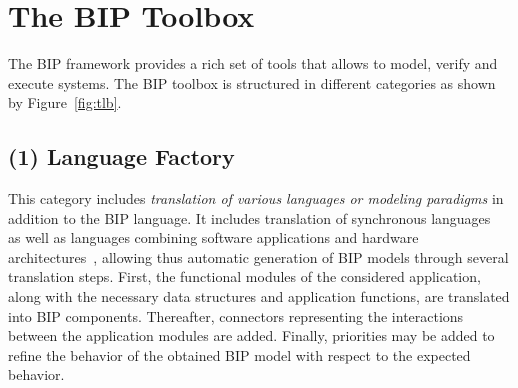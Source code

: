 \section{The BIP Toolbox}
The BIP framework provides a rich set of tools that allows to model, verify and execute 
systems. The BIP toolbox is structured in different categories as shown by Figure~\ref{fig:tlb}.


\subsection*{(1) Language Factory}
This category includes \emph{translation of various languages or modeling paradigms} 
in addition to the BIP language. It includes translation of synchronous 
languages~\cite{imp:lustre,imp:sim} as well as languages combining software applications
and hardware architectures~\cite{imp:aadl,imp:tinyos,imp:dol}, allowing thus automatic generation 
of BIP models through several translation steps. 
First, the functional modules of the considered application, along
with the necessary data structures and application functions, are translated into 
BIP components.  Thereafter, connectors representing the interactions between the application
modules are added. Finally, priorities may be added to refine the behavior of the obtained
BIP model with respect to the expected behavior.


